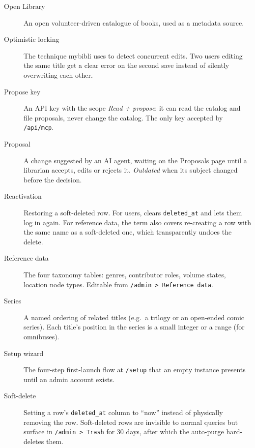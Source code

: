 \begin{description}
  \item[Open Library] An open volunteer-driven
        catalogue of books, used as a metadata source.

  \item[Optimistic locking] The technique mybibli uses to detect
        concurrent edits. Two users editing the same title get a
        clear error on the second save instead of silently
        overwriting each other.

  \item[Propose key] An API key with the scope
        \emph{Read + propose}: it can read the catalog and file
        proposals, never change the catalog. The only key accepted by
        \texttt{/api/mcp}.

  \item[Proposal] A change suggested by an AI agent,
        waiting on the Proposals page until a librarian accepts,
        edits or rejects it. \emph{Outdated} when its subject changed
        before the decision.

  \item[Reactivation] Restoring a soft-deleted row. For users,
        clears \texttt{deleted\_at} and lets them log in again.
        For reference data, the term also covers re-creating a
        row with the same name as a soft-deleted one, which
        transparently undoes the delete.

  \item[Reference data] The four taxonomy tables: genres,
        contributor roles, volume states, location node types.
        Editable from \texttt{/admin > Reference data}.

  \item[Series] A named ordering of related titles
        (e.g.\ a trilogy or an open-ended comic series). Each
        title's position in the series is a small integer or a
        range (for omnibuses).

  \item[Setup wizard] The four-step
        first-launch flow at \texttt{/setup} that an empty
        instance presents until an admin account exists.

  \item[Soft-delete] Setting a row's
        \texttt{deleted\_at} column to ``now'' instead of
        physically removing the row. Soft-deleted rows are
        invisible to normal queries but surface in
        \texttt{/admin > Trash} for 30 days, after which the
        auto-purge hard-deletes them.


\end{description}
